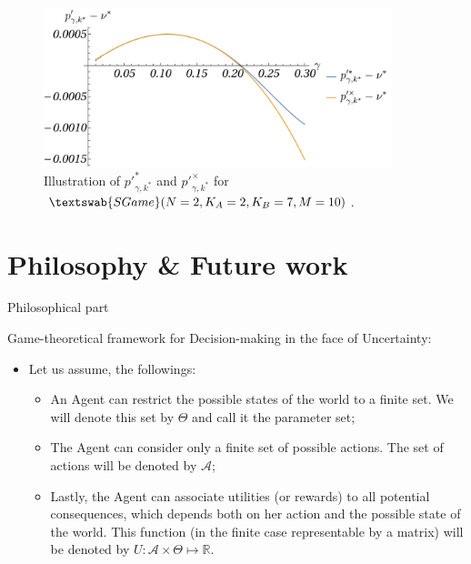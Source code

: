 \documentclass{beamer}
\theoremstyle{definition}
\newcommand{\SG}[1]{$\textswab{SGame}(#1)$}
\begin{document}
\begin{frame}{}

    \begin{figure}[H]
    \centering
    \includegraphics[width=0.9\textwidth]{img/AsymptoticExpasion_pp.pdf}
    \caption{\small \centering Illustration of $p'^*_{\gamma,k^*}$ and $p'^\times_{\gamma,k^*}$ for \SG{N=2,K_A=2,K_B=7,M=10}.}
    \label{fig:Asymptotic_pp}
\end{figure}

\end{frame}

\section{Philosophy \& Future work}

\begin{frame}{Philosophical part}

Game-theoretical framework for Decision-making in the face of Uncertainty:

\begin{itemize}
    \item Let us assume, the followings:
    \begin{itemize}
    \item An Agent can restrict the possible states of the world to a finite set. We will denote this set by $\Theta$ and call it the parameter set;
    \item The Agent can consider only a finite set of possible actions. The set of actions will be denoted by $\mathcal{A}$;
    \item Lastly, the Agent can associate utilities (or rewards) to all potential consequences, which depends both on her action and the possible state of the world. This function (in the finite case representable by a matrix) will be denoted by $U: \mathcal{A} \times \Theta \mapsto \mathbb{R}$.
\end{itemize}
\end{itemize}

\end{frame}
\end{document}
